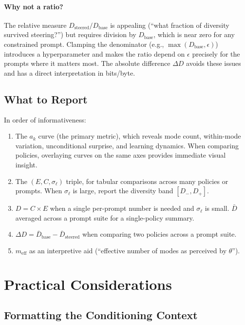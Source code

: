 \documentclass[11pt]{article}
\begin{document}
\paragraph{Why not a ratio?} The relative measure $D_{\mathrm{steered}} / D_{\mathrm{base}}$ is appealing (``what fraction of diversity survived steering?'') but requires division by $D_{\mathrm{base}}$, which is near zero for any constrained prompt. Clamping the denominator (e.g., $\max(D_{\mathrm{base}}, \epsilon)$) introduces a hyperparameter and makes the ratio depend on $\epsilon$ precisely for the prompts where it matters most. The absolute difference $\Delta D$ avoids these issues and has a direct interpretation in bits/byte.

\subsection{What to Report}

In order of informativeness:
\begin{enumerate}[nosep]
    \item The $a_k$ curve (the primary metric), which reveals mode count, within-mode variation, unconditional surprise, and learning dynamics. When comparing policies, overlaying curves on the same axes provides immediate visual insight.
    \item The $(E, C, \sigma_\ell)$ triple, for tabular comparisons across many policies or prompts. When $\sigma_\ell$ is large, report the diversity band $[D_-, D_+]$.
    \item $D = C \times E$ when a single per-prompt number is needed and $\sigma_\ell$ is small. $\bar{D}$ averaged across a prompt suite for a single-policy summary.
    \item $\Delta D = \bar{D}_{\mathrm{base}} - \bar{D}_{\mathrm{steered}}$ when comparing two policies across a prompt suite.
    \item $m_{\mathrm{eff}}$ as an interpretive aid (``effective number of modes as perceived by $\theta$'').
\end{enumerate}

\section{Practical Considerations}\label{sec:practical}

\subsection{Formatting the Conditioning Context}
\end{document}
